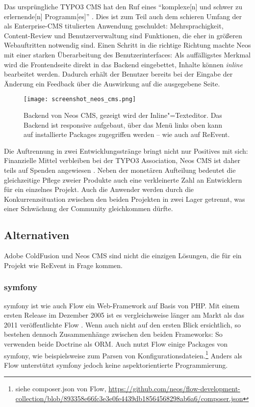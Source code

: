 Das ursprüngliche TYPO3 CMS hat den Ruf eines \enquote{komplexe[n] und schwer zu erlernende[n] Programm[es]} \cite[S. X]{Bielitza.2011}. Dies ist zum Teil auch dem schieren Umfang der als Enterprise-CMS titulierten Anwendung geschuldet: Mehrsprachigkeit, Content-Review und Benutzerverwaltung sind Funktionen, die eher in größeren Webauftritten notwendig sind. Einen Schritt in die richtige Richtung machte Neos mit einer starken Überarbeitung des Benutzerinterfaces: Als auffälligstes Merkmal wird die Frontendseite direkt in das Backend eingebettet, Inhalte können \emph{inline} bearbeitet werden. Dadurch erhält der Benutzer bereits bei der Eingabe der Änderung ein Feedback über die Auswirkung auf die ausgegebene Seite.

\begin{figure}[ht!]
\begin{margincap}
\texttt{[image: screenshot\_neos\_cms.png]}
\caption[Neos CMS Backend]{Backend von Neos CMS, gezeigt wird der Inline"=Texteditor. Das Backend ist responsive aufgebaut, über das Menü links oben kann auf installierte Packages zugegriffen werden -- wie auch auf ReEvent.}
\label{img:neos_backend_screenshot}
\end{margincap}
\end{figure}

Die Auftrennung in zwei Entwicklungsstränge bringt nicht nur Positives mit sich: Finanzielle Mittel verbleiben bei der TYPO3 Association, Neos CMS ist daher teils auf Spenden angewiesen \cite{NeosCMS.2015b}. Neben der monetären Aufteilung bedeutet die gleichzeitige Pflege zweier Produkte auch eine verkleinerte Zahl an Entwicklern für ein einzelnes Projekt. Auch die Anwender werden durch die Konkurrenzsituation zwischen den beiden Projekten in zwei Lager getrennt, was einer Schwächung der Community gleichkommen dürfte.

\subsection{Alternativen}

Adobe ColdFusion und Neos CMS sind nicht die einzigen Lösungen, die für ein Projekt wie ReEvent in Frage kommen.

\subsubsection{symfony}
symfony ist wie auch Flow ein Web-Framework auf Basis von PHP. Mit einem ersten Release im Dezember 2005 ist es vergleichsweise länger am Markt als das 2011 veröffentlichte Flow \cite[S. 21]{Potencier.}. Wenn auch nicht auf den ersten Blick ersichtlich, so bestehen dennoch Zusammenhänge zwischen den beiden Frameworks: So verwenden beide Doctrine als ORM. Auch nutzt Flow einige Packages von symfony, wie beispielsweise zum Parsen von Konfigurationsdateien.\footnote{ siehe composer.json von Flow, \url{https://github.com/neos/flow-development-collection/blob/893358e66fc3e3e0fe4439db18564568298ab6a6/composer.json}} Anders als Flow unterstützt symfony jedoch keine aspektorientierte Programmierung.

